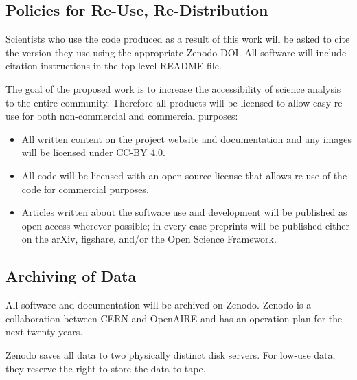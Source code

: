 \documentclass[11pt,oneside]{memoir}
\begin{document}


\subsection{Policies for Re-Use, Re-Distribution}
Scientists who use the code produced as a result of this work will be asked to cite the version they use using the appropriate Zenodo DOI.  All software will include citation instructions in the top-level README file.

The goal of the proposed work is to increase the accessibility of science analysis to the entire community.  Therefore all products will be licensed to allow easy re-use for both non-commercial and commercial purposes:

\begin{itemize}
  \item All written content on the project website and documentation and any images will be licensed under CC-BY 4.0. 
  \item All code will be licensed with an open-source license that allows re-use of the code for commercial purposes.  
  \item Articles written about the software use and development will be published as open access wherever possible; in every case preprints will be published either on the arXiv, figshare, and/or the Open Science Framework.
\end{itemize}



\subsection{Archiving of Data}
All software and documentation will be archived on Zenodo.  Zenodo is a collaboration between CERN and OpenAIRE and has an operation plan for the next twenty years.

Zenodo saves all data to two physically distinct disk servers.  For low-use data, they reserve the right to store the data to tape.

\end{document}
